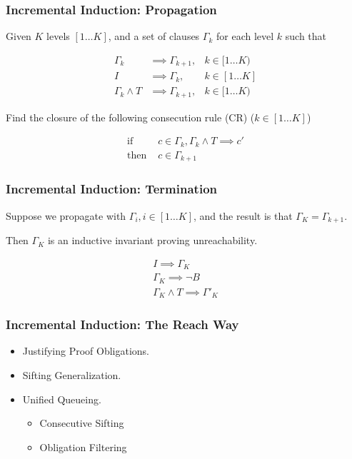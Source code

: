 \documentclass{beamer}
\begin{document}
\begin{frame}
	\frametitle{Incremental Induction: Propagation}
Given $K$ levels $[1\ldots K]$, and a set of clauses $\Gamma_k$ for each
level $k$ such that

	\begin{center}
		\begin{align*}
			\Gamma_k & \implies \Gamma_{k+1}, &k \in [1\ldots K)\\
			I & \implies \Gamma_k, &k \in [1\ldots K]\\
			\Gamma_k \wedge T & \implies \Gamma_{k+1}, &k \in [1\ldots K)
		\end{align*}
	\end{center}

	Find the closure of the following consecution rule (CR) ($k \in [1 \ldots K]$)

	\begin{center}
		\begin{align*}
			\mbox{if }&c \in \Gamma_k, \Gamma_k \wedge T  \implies c'\\
			\mbox{then }&c \in \Gamma_{k+1}
		\end{align*}
	\end{center}

\end{frame}

\begin{frame}
	\frametitle{Incremental Induction: Termination}
	Suppose we propagate with $\Gamma_i, i \in [1\ldots K]$, and
	the result is that $\Gamma_K = \Gamma_{k+1}$.

	Then $\Gamma_K$ is an inductive invariant proving unreachability.

	\begin{align*}
		I \implies \Gamma_K\\
		\Gamma_K \implies \neg B\\
		\Gamma_K \wedge T \implies \Gamma'_K
	\end{align*}
\end{frame}


\begin{frame}
	\frametitle{Incremental Induction: The Reach Way}
	\begin{itemize}
			\item Justifying Proof Obligations.
			\item Sifting Generalization.
			\item Unified Queueing.
				\begin{itemize}
					\item Consecutive Sifting
					\item Obligation Filtering
				\end{itemize}
	\end{itemize}
\end{frame}
\end{document}
